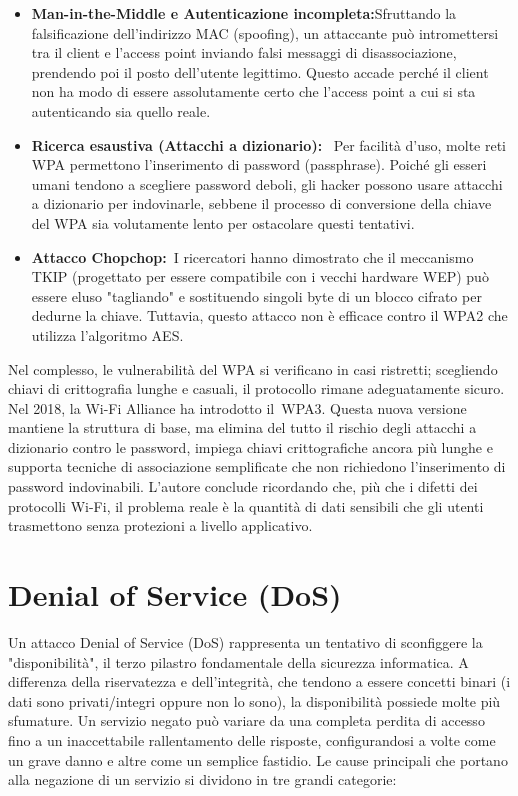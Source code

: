 \documentclass{article}
\begin{document}
\begin{itemize}
    \item \textbf{Man-in-the-Middle e Autenticazione incompleta:}Sfruttando la falsificazione dell'indirizzo MAC (spoofing), un attaccante può intromettersi tra il client e l'access point inviando falsi messaggi di disassociazione, prendendo poi il posto dell'utente legittimo. Questo accade perché il client non ha modo di essere assolutamente certo che l'access point a cui si sta autenticando sia quello reale.
    \item \textbf{Ricerca esaustiva (Attacchi a dizionario):}  Per facilità d'uso, molte reti WPA permettono l'inserimento di password (passphrase). Poiché gli esseri umani tendono a scegliere password deboli, gli hacker possono usare attacchi a dizionario per indovinarle, sebbene il processo di conversione della chiave del WPA sia volutamente lento per ostacolare questi tentativi.
    \item \textbf{Attacco Chopchop:} I ricercatori hanno dimostrato che il meccanismo TKIP (progettato per essere compatibile con i vecchi hardware WEP) può essere eluso "tagliando" e sostituendo singoli byte di un blocco cifrato per dedurne la chiave. Tuttavia, questo attacco non è efficace contro il WPA2 che utilizza l'algoritmo AES.
\end{itemize}

Nel complesso, le vulnerabilità del WPA si verificano in casi ristretti; scegliendo chiavi di crittografia lunghe e casuali, il protocollo rimane adeguatamente sicuro. Nel 2018, la Wi-Fi Alliance ha introdotto il WPA3. Questa nuova versione mantiene la struttura di base, ma elimina del tutto il rischio degli attacchi a dizionario contro le password, impiega chiavi crittografiche ancora più lunghe e supporta tecniche di associazione semplificate che non richiedono l'inserimento di password indovinabili. L'autore conclude ricordando che, più che i difetti dei protocolli Wi-Fi, il problema reale è la quantità di dati sensibili che gli utenti trasmettono senza protezioni a livello applicativo.

\section*{Denial of Service (DoS)}

Un attacco Denial of Service (DoS) rappresenta un tentativo di sconfiggere la "disponibilità", il terzo pilastro fondamentale della sicurezza informatica. A differenza della riservatezza e dell'integrità, che tendono a essere concetti binari (i dati sono privati/integri oppure non lo sono), la disponibilità possiede molte più sfumature. Un servizio negato può variare da una completa perdita di accesso fino a un inaccettabile rallentamento delle risposte, configurandosi a volte come un grave danno e altre come un semplice fastidio. Le cause principali che portano alla negazione di un servizio si dividono in tre grandi categorie:
\end{document}
